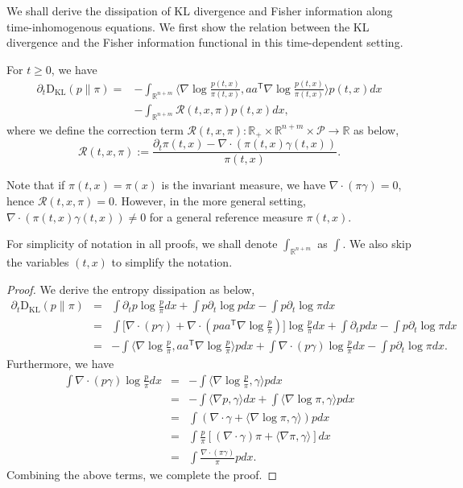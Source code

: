 \documentclass[11pt,reqno]{amsart}
\newcommand{\la}{\langle}
\newcommand{\ra}{\rangle}
\newcommand{\ts}{\mathsf{T}}
\newcommand{\beaa}{\begin{eqnarray*}}
\newcommand{\eeaa}{\end{eqnarray*}}
\def\pa{\partial}
\def\qed{ \hfill \vrule width.25cm height.25cm depth0cm\smallskip}
\newcommand{\kl}{\mathrm D_{\mathrm{KL}}}
\begin{document}
We shall derive the dissipation of KL divergence and Fisher information along time-inhomogenous equations. We first show the relation between the KL divergence and the Fisher information functional in this time-dependent setting.
\begin{proposition}
For $t\ge 0$, we have
	\begin{equation}\label{KL decay}
	\begin{split}
	\pa_t \kl(p \|\pi)=&-\int_{\mathbb R^{n+m}} \la \nabla\log\frac{p(t,x) }{\pi(t,x)},aa^{\ts}\nabla\log\frac{p(t,x) }{\pi(t,x)}\ra p(t,x)  dx\\
 &-\int_{\mathbb R^{n+m}} \mathcal{R}(t,x,\pi)p(t,x)  dx,
 \end{split}
	\end{equation}
	where we define the correction term $\mathcal{R}(t,x,\pi):\mathbb R_+\times \mathbb R^{n+m}\times \mathcal P\rightarrow \mathbb R$ as below,  
\begin{equation}\label{correction R}
\mathcal{R}(t,x, \pi ):=\frac{\pa_t \pi(t,x) -\nabla\cdot(\pi(t,x)\gamma(t,x))}{\pi(t,x)}.
\end{equation}
\end{proposition}
\begin{remark}
    Note that if $\pi(t,x)=\pi(x)$ is the invariant measure, we have $\nabla\cdot (\pi \gamma)=0$, hence $\mathcal R(t,x,\pi)=0$. However, in the more general setting, $\nabla\cdot(\pi(t,x)\gamma(t,x))\neq 0$ for a general reference measure $\pi(t,x)$. 
\end{remark}
For simplicity of notation in all proofs, we shall denote $\int_{\mathbb{R}^{n+m}}$ as $\int$. We also skip the variables $(t,x)$ to simplify the notation. 

\begin{proof}
We derive the entropy dissipation as below,
\beaa
\pa_t \kl ({p} \|\pi)&=&\int \pa_t {p}  \log\frac{{p} }{\pi}dx+\int {p}  \pa_t\log{p}  dx-\int {p}  \pa_t\log\pi dx\\
&=&\int \big[\nabla\cdot  ( {p}  \gamma )+\nabla\cdot ({p}  aa^{\ts}\nabla \log \frac{{p} }{\pi} ) \big]\log\frac{{p} }{\pi}dx+\int\pa_t{p}  dx-\int {p}  \pa_t\log\pi dx\\
&=&-\int \la \nabla\log\frac{{p} }{\pi},aa^{\ts}\nabla\log\frac{{p} }{\pi}\ra{p}  dx+\int \nabla\cdot ({p} \gamma)\log\frac{{p} }{\pi}dx-\int {p}  \pa_t\log\pi dx.
\eeaa
Furthermore, we have 
\beaa
 \int \nabla\cdot ({p} \gamma)\log\frac{{p} }{\pi}dx&=&-\int \la \nabla\log\frac{{p} }{\pi},\gamma\ra {p}  dx\\
 &=&-\int \la \nabla {p} ,\gamma\ra dx +\int \la \nabla\log\pi,\gamma\ra {p}  dx\\
 &=&\int(\nabla\cdot \gamma +\la \nabla\log\pi,\gamma\ra){p}  dx\\
 &=&\int \frac{{p} }{\pi}[(\nabla\cdot \gamma)\pi +\la \nabla\pi,\gamma\ra ]dx\\
 &=&\int \frac{\nabla\cdot(\pi\gamma)}{\pi}{p}  dx.
 \eeaa
 Combining the above terms, we complete the proof.\qed 
\end{proof}
\end{document}
